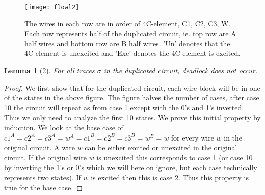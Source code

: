 \documentclass{article}
\newtheorem*{lemma}{Lemma}
\begin{document}
\begin{figure}
  \centering
    \texttt{[image: flowl2]}
  \caption{The wires in each row are in order of 4C-element, C1, C2, C3, W.  Each row represents half of the duplicated circuit, ie. top row are A half wires and bottom row are B half wires.  'Un' denotes that the 4C element is unexcited and 'Exc' denotes the 4C element is excited.  }
\end{figure}

\begin{lemma}[2]
For all traces $\sigma$ in the duplicated circuit, deadlock does not occur.
\end{lemma}
\begin{proof}
We first show that for the duplicated circuit, each wire block will be in one of the states in the above figure.  The figure halves the number of cases, after case 10 the circuit will repeat as from case 1 except with the 0's and 1's inverted.  Thus we only need to analyze the first 10 states.  \newline
We prove this initial property by induction.  We look at the base case of $c1^A=c2^A=c3^A=w^A=c1^B=c2^B=c3^B=w^B=w$ for every wire $w$ in the original circuit.  A wire $w$ can be either excited or unexcited in the original circuit. If the original wire $w$ is unexcited this corresponds to case 1 (or case 10 by inverting the 1's or 0's which we will here on ignore, but each case technically represents two states).  If $w$ is excited then this is case 2.  Thus this property is true for the base case. \newline


\end{proof}
\end{document}
